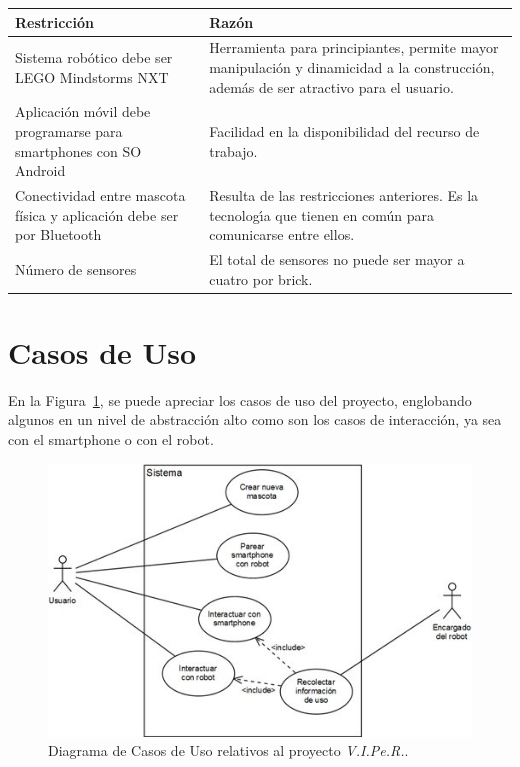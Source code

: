 \documentclass[letterpaper,12pt]{article} %
\numberwithin{equation}{section} %
\numberwithin{figure}{section} %
\numberwithin{table}{section} %
\begin{document}
\begin{table}[H]
  \centering
  \begin{tabular}{p{5cm}p{9cm}}\hline
    Restricci\'on & Raz\'on \\ \hline\hline %
    Sistema rob\'otico debe ser LEGO Mindstorms NXT & Herramienta para principiantes, permite mayor manipulaci\'on y dinamicidad a la construcci\'on, adem\'as de ser atractivo para el usuario.\\ \hline
    Aplicaci\'on m\'ovil debe programarse para smartphones con SO Android & Facilidad en la disponibilidad del recurso de trabajo. \\ \hline
    Conectividad entre mascota f\'isica y aplicaci\'on debe ser por Bluetooth & Resulta de las restricciones anteriores. Es la tecnolog\'{\i}a que tienen en com\'un para comunicarse entre ellos.\\ \hline
    N\'umero de sensores & El total de sensores no puede ser mayor a cuatro por brick.\\\hline \hline
  \end{tabular}
\end{table}

\newpage
\section{Casos de Uso} %

En la Figura~\ref{fig:CasoUso}, se puede apreciar los casos de uso del proyecto, englobando algunos en un nivel de abstracci\'on alto como son los casos de interacci\'on, ya sea con el smartphone o con el robot.\\

\begin{figure}[H]
   \centering
     \includegraphics[scale=.9]{CasoUso.jpg}
   \caption{Diagrama de Casos de Uso relativos al proyecto \emph{V.I.Pe.R.}.}
   \label{fig:CasoUso}
\end{figure}
\end{document}
